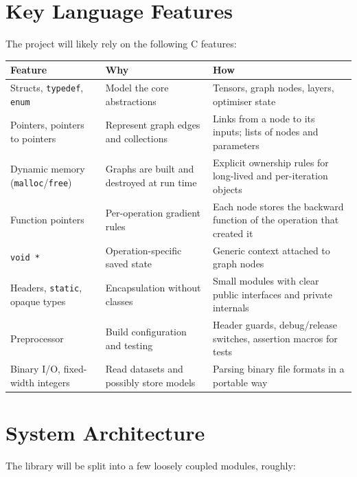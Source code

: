 \documentclass[11pt,a4paper]{article}
\newcommand{\code}[1]{\texttt{#1}}
\begin{document}
\section{Key Language Features}

The project will likely rely on the following C features:

{\small
\begin{longtable}{@{}L{0.27\textwidth} L{0.33\textwidth} L{0.34\textwidth}@{}}
\toprule
\textbf{Feature} & \textbf{Why} & \textbf{How} \\
\midrule
\endhead
Structs, \code{typedef}, \code{enum}
  & Model the core abstractions
  & Tensors, graph nodes, layers, optimiser state \\
Pointers, pointers to pointers
  & Represent graph edges and collections
  & Links from a node to its inputs; lists of nodes and parameters \\
Dynamic memory (\code{malloc}/\code{free})
  & Graphs are built and destroyed at run time
  & Explicit ownership rules for long-lived and per-iteration objects \\
Function pointers
  & Per-operation gradient rules
  & Each node stores the backward function of the operation that created it \\
\code{void *}
  & Operation-specific saved state
  & Generic context attached to graph nodes \\
Headers, \code{static}, opaque types
  & Encapsulation without classes
  & Small modules with clear public interfaces and private internals \\
Preprocessor
  & Build configuration and testing
  & Header guards, debug/release switches, assertion macros for tests \\
Binary I/O, fixed-width integers
  & Read datasets and possibly store models
  & Parsing binary file formats in a portable way \\
\bottomrule
\end{longtable}
}

\section{System Architecture}

The library will be split into a few loosely coupled modules, roughly:
\end{document}
